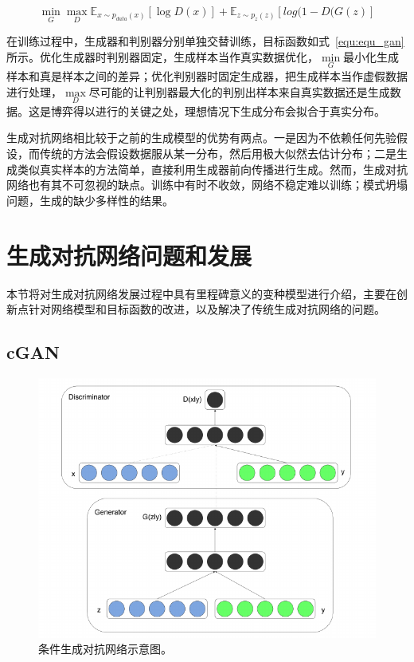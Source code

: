 \begin{equation}
\label{equ:equ_gan}
\mathop{min} \limits_{G} \mathop{max} \limits_{D} \mathbb{E}_{x \sim p_{data}(x)}[\log D(x)] + \mathbb{E}_{z \sim p_{z}(z)}[log(1-D(G(z)]
\end{equation}

在训练过程中，生成器和判别器分别单独交替训练，目标函数如式~\ref{equ:equ_gan}所示。优化生成器时判别器固定，生成样本当作真实数据优化，$\min \limits_{G}$最小化生成样本和真是样本之间的差异；优化判别器时固定生成器，把生成样本当作虚假数据进行处理，$\max \limits_{D}$尽可能的让判别器最大化的判别出样本来自真实数据还是生成数据。这是博弈得以进行的关键之处，理想情况下生成分布会拟合于真实分布。

生成对抗网络相比较于之前的生成模型的优势有两点。一是因为不依赖任何先验假设，而传统的方法会假设数据服从某一分布，然后用极大似然去估计分布；二是生成类似真实样本的方法简单，直接利用生成器前向传播进行生成。然而，生成对抗网络也有其不可忽视的缺点。训练中有时不收敛，网络不稳定难以训练；模式坍塌问题，生成的缺少多样性的结果。

\section{生成对抗网络问题和发展}
本节将对生成对抗网络发展过程中具有里程碑意义的变种模型进行介绍，主要在创新点针对网络模型和目标函数的改进，以及解决了传统生成对抗网络的问题。
\subsection{cGAN}

\begin{figure}[ht]
    \centering
	\includegraphics[width=\textwidth]{figures/cgan.pdf}
	\caption{条件生成对抗网络示意图。}
	\label{fig:pic_cgan}
\end{figure}

